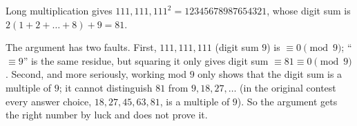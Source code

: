 Long multiplication gives $111{,}111{,}111^2=12345678987654321$, whose digit sum is $2(1+2+\dots+8)+9=\boxed{81}$.

The argument has two faults. First, $111{,}111{,}111$ (digit sum $9$) is $\equiv0\pmod9$; ``$\equiv9$'' is the same residue, but squaring it only gives digit sum $\equiv81\equiv0\pmod9$. Second, and more seriously, working mod $9$ only shows that the digit sum is a multiple of $9$; it cannot distinguish $81$ from $9,18,27,\dots$ (in the original contest every answer choice, $18,27,45,63,81$, is a multiple of $9$). So the argument gets the right number by luck and does not prove it.

